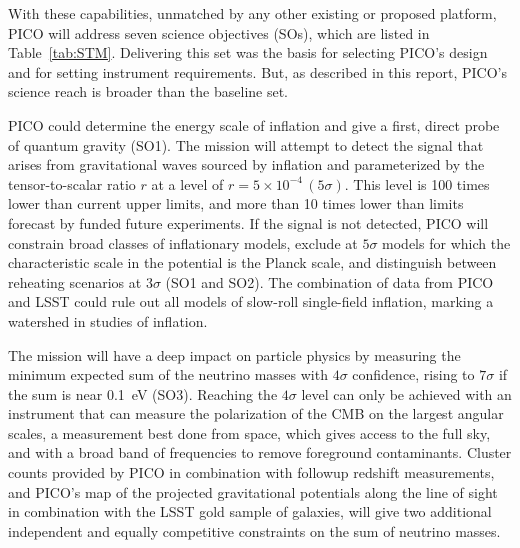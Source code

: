 \documentclass[PICOAPC.tex]{subfiles}
\begin{document}
With these capabilities, unmatched by any other existing or proposed platform, PICO will address seven science objectives (SOs), which are listed in Table~\ref{tab:STM}. Delivering this set was the basis for selecting PICO's design and for setting instrument requirements. But, as described in this report, PICO's science reach is broader than the baseline set. 

PICO could determine the energy scale of inflation and give a first, direct probe of quantum gravity (SO1). %
The mission will attempt to detect the signal that arises from gravitational waves sourced by inflation and parameterized by the tensor-to-scalar ratio $r$ at a level of $r =5\times10^{-4} \, (5\sigma)$. This level is 100 times lower than current upper limits, and more than 10 times lower than limits forecast by funded future experiments.  If the signal is not detected, PICO will constrain broad classes of inflationary models, exclude at $5 \sigma$ models for which the characteristic scale in the potential is the Planck scale, and distinguish between reheating scenarios at $3\sigma$ (SO1 and SO2). The combination of data from PICO and LSST could rule out all models of slow-roll single-field inflation, marking a watershed in studies of inflation. 


The mission will have a deep impact on particle physics by measuring the minimum expected sum of the neutrino masses with $4\sigma$ confidence, rising to $7\sigma$ if the sum is near 0.1~eV (SO3). Reaching the $4\sigma$ level can only be achieved with an instrument that can measure the polarization of the CMB on the largest angular scales, a measurement best done from space, which gives access to the full sky, and with a broad band of frequencies to remove foreground contaminants.  
Cluster counts provided by PICO in combination with followup redshift measurements, and PICO's map of the projected gravitational potentials along the line of sight in combination with the LSST gold sample of galaxies, will give two additional independent and equally competitive constraints on the sum of neutrino masses. 
\end{document}
